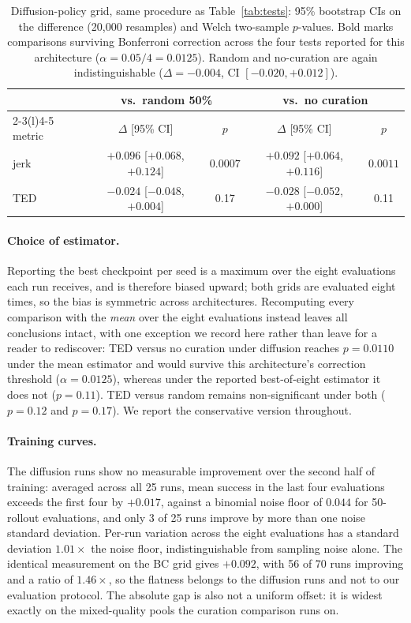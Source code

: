\documentclass[10pt]{article}
\begin{document}
\begin{table}[h]
\centering
\small
\begin{tabular}{lcccc}
\toprule
& \multicolumn{2}{c}{vs.\ random 50\%} & \multicolumn{2}{c}{vs.\ no curation} \\
\cmidrule(lr){2-3}\cmidrule(l){4-5}
metric & $\Delta$ [95\% CI] & $p$ & $\Delta$ [95\% CI] & $p$ \\
\midrule
jerk & $+0.096$ [$+0.068$, $+0.124$] & $\mathbf{0.0007}$ & $+0.092$ [$+0.064$, $+0.116$] & $\mathbf{0.0011}$ \\
TED  & $-0.024$ [$-0.048$, $+0.004$] & 0.17 & $-0.028$ [$-0.052$, $+0.000$] & 0.11 \\
\bottomrule
\end{tabular}
\caption{Diffusion-policy grid, same procedure as Table~\ref{tab:tests}:
95\% bootstrap CIs on the difference (20{,}000 resamples) and Welch
two-sample $p$-values. Bold marks comparisons surviving Bonferroni
correction across the four tests reported for this architecture
($\alpha = 0.05/4 = 0.0125$). Random and no-curation are again
indistinguishable ($\Delta = -0.004$, CI $[-0.020, +0.012]$).}
\label{tab:crossarch_tests}
\end{table}

\paragraph{Choice of estimator.} Reporting the best checkpoint per seed is a
maximum over the eight evaluations each run receives, and is therefore
biased upward; both grids are evaluated eight times, so the bias is
symmetric across architectures. Recomputing every comparison with the
\emph{mean} over the eight evaluations instead leaves all conclusions
intact, with one exception we record here rather than leave for a reader to
rediscover: TED versus no curation under diffusion reaches $p = 0.0110$
under the mean estimator and would survive this architecture's correction
threshold ($\alpha = 0.0125$), whereas under the reported best-of-eight
estimator it does not ($p = 0.11$). TED versus random remains
non-significant under both ($p = 0.12$ and $p = 0.17$). We report the
conservative version throughout.

\paragraph{Training curves.} The diffusion runs show no measurable
improvement over the second half of training: averaged across all 25 runs,
mean success in the last four evaluations exceeds the first four by
$+0.017$, against a binomial noise floor of $0.044$ for 50-rollout
evaluations, and only 3 of 25 runs improve by more than one noise standard
deviation. Per-run variation across the eight evaluations has a standard
deviation $1.01\times$ the noise floor, indistinguishable from sampling
noise alone. The identical measurement on the BC grid gives $+0.092$, with
56 of 70 runs improving and a ratio of $1.46\times$, so the flatness belongs
to the diffusion runs and not to our evaluation protocol. The absolute gap
is also not a uniform offset: it is widest exactly on the mixed-quality
pools the curation comparison runs on.
\end{document}
